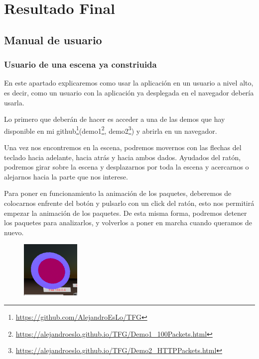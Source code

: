 \documentclass[a4paper, 12pt]{book}
\begin{document}

\cleardoublepage
\chapter{Resultado Final}
\section{Manual de usuario}
\subsection{Usuario de una escena ya constriuida}

En este apartado explicaremos como usar la aplicación en un usuario a nivel alto, es decir, como un usuario con la aplicación ya desplegada en el navegador debería usarla.

Lo primero que deberán de hacer es acceder a una de las demos que hay disponible en mi github\footnote{\url{https://github.com/AlejandroEsLo/TFG}}(demo1\footnote{\url{https://alejandroeslo.github.io/TFG/Demo1_100Packets.html}}, demo2\footnote{\url{https://alejandroeslo.github.io/TFG/Demo2_HTTPPackets.html}}) y abrirla en un navegador.

Una vez nos encontremos en la escena, podremos movernos con las flechas del teclado hacia adelante, hacia atrás y hacia ambos dados. Ayudados del ratón, podremos girar sobre la escena y desplazarnos por toda la escena y acercarnos o alejarnos hacia la parte que nos interese.

Para poner en funcionamiento la animación de los paquetes, deberemos de colocarnos enfrente del botón y pulsarlo con un click del ratón, esto nos permitirá empezar la animación de los paquetes. De esta misma forma, podremos detener los paquetes para analizarlos, y volverlos a poner en marcha cuando queramos de nuevo.
\begin{figure}[h]
\centering
    \includegraphics[scale=0.5]{img/boton_im.png}
\end{figure}
\end{document}
